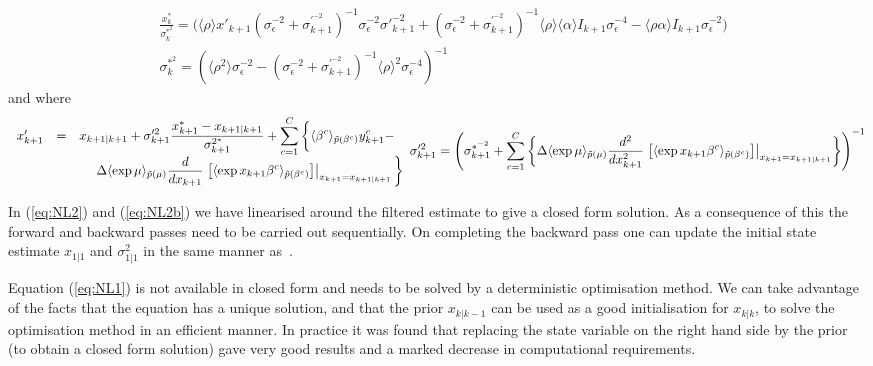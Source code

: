 \documentclass[12pt]{article}
\begin{document}
\[ \begin{split} &\frac{x_{k}^*}{\sigma^{*^2}_{k}} = \bigg(\langle \rho \rangle
	x'_{k+1}(\sigma^{-2}_\epsilon + \sigma^{'^{-2}}_{k+1})^{-1}
	\sigma^{-2}_\epsilon\sigma'^{-2}_{k+1} + (\sigma^{-2}_\epsilon + \sigma^{'^{-2}}_{k+1})^{-1}
	\langle \rho \rangle \langle \alpha \rangle I_{k+1}\sigma^{-4}_\epsilon - \langle \rho\alpha
	\rangle I_{k+1}\sigma^{-2}_\epsilon \bigg)\\ &\sigma^{*^2}_{k} = (\langle \rho^2
	\rangle\sigma^{-2}_\epsilon - (\sigma^{-2}_\epsilon + \sigma^{'^{-2}}_{k+1})^{-1}\langle
	\rho \rangle^2\sigma^{-4}_\epsilon )^{-1} \end{split} \] \noindent and where
	\begin{subequations} \begin{equation} \begin{array}{rcl} x'_{k+1} &=& \displaystyle
		x_{k+1|k+1} + \sigma'^2_{k+1}\frac{x_{k+1}^* - x_{k+1|k+1}}{\sigma^{2^*}_{k+1}} +
		\sum_{c=1}^C \bigg\{\langle\beta^c\rangle_{\pt(\beta^c)}y^c_{k+1} - \\[2ex] &&
		~~~~\displaystyle \Delta \langle \exp{\mu} \rangle_{\pt(\mu)}
		\frac{d}{dx_{k+1}}\left.\left[\langle \exp{x_{k+1}\beta^c}
		\rangle_{\pt(\beta^c)}\right]\right|_{x_{k+1} = x_{k+1|k+1} }  \bigg\}
		\label{eq:NL2}  \\ \end{array} \end{equation} \begin{equation} \sigma'^2_{k+1} =
			\left({\sigma}^{*^{-2}}_{k+1} + \sum_{c=1}^C \left\{\Delta  \langle
			\exp{\mu} \rangle_{\pt(\mu)} \frac{d^2}{dx_{k+1}^2}\left.\left[\langle
			\exp{x_{k+1}\beta^c} \rangle_{\pt(\beta^c)}\right]\right|_{x_{k+1} =
			x_{k+1|k+1}}\right\}\right)^{-1} \label{eq:NL2b} \end{equation}
		\end{subequations}
		
		In (\ref{eq:NL2}) and (\ref{eq:NL2b}) we have linearised around
		the filtered estimate to give a closed form solution. As a consequence of this the forward and backward passes need to be carried out	sequentially. On completing the backward pass one can update the initial state estimate $x_{1|1}$ and $\sigma^2_{1|1}$ in the same manner	as~\cite{Smith_2003}.

Equation (\ref{eq:NL1}) is not available in closed form and needs to be solved by a deterministic
optimisation method. We can take advantage of the facts that the equation has a unique solution, and
that the prior $x_{k|k-1}$ can be used as a good initialisation for $x_{k|k}$, to solve the optimisation method
in an efficient manner. In practice it was found that replacing the state variable on the right hand
side by the prior (to obtain a closed form solution) gave very good results and a marked decrease in
computational requirements.
\end{document}

